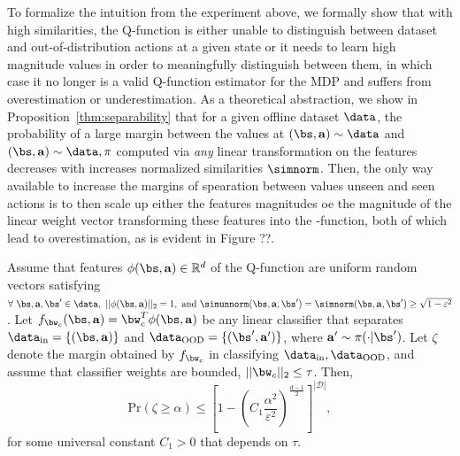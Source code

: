 To formalize the intuition from the experiment above, we formally show that with high similarities, the Q-function is either unable to distinguish between dataset and out-of-distribution actions at a given state or it needs to learn high magnitude values in order to meaningfully distinguish between them, in which case it no longer is a valid Q-function estimator for the MDP and suffers from overestimation or underestimation. 
As a theoretical abstraction, we show in Proposition~\ref{thm:separability} that for a given offline dataset $\data$, %
the probability of a large margin between the values at  $(\bs, \mathbf{a}) \sim \data$ and $(\bs, \mathbf{a}) \sim \data, \pi$
computed via \emph{any} linear transformation on the features decreases with increases normalized similarities $\simnorm$. Then, the only way available to increase the margins of spearation between values unseen and seen actions is to then scale up either the features magnitudes oe the magnitude of the linear weight vector transforming these features into the -function, both of which lead to overestimation, as is evident in Figure ??. 
\begin{proposition}
\label{thm:separability}
Assume that features $\phi(\bs, \mathbf{a}) \in \mathbb{R}^d$ of the Q-function are uniform random vectors satisfying $\forall~ \bs, \mathbf{a}, \bs' \in \data,~ ||\phi(\bs, \mathbf{a})||_2 = 1,\ \mathrm{and}\ \simunnorm(\bs, \mathbf{a}, \bs') = \simnorm(\bs, \mathbf{a}, \bs') \geq \sqrt{1 - \varepsilon^2}$. Let $f_{\bw_c}(\bs, \mathbf{a}) = \bw_c^T \phi(\bs, \mathbf{a})$ be any linear classifier that separates $\data_{\mathrm{in}} = \{(\bs, \mathbf{a})\}$ and $\data_{\mathrm{OOD}} = \{(\bs', \mathbf{a}')\}$, where $\mathbf{a}' \sim \pi(\cdot|\bs')$. Let $\zeta$ denote the margin obtained by $f_{\bw_c}$ in classifying $\data_{\mathrm{in}}, \data_{\mathrm{OOD}}$, and  assume that classifier weights are bounded, $||\bw_c||_2 \leq \tau$.
Then, 
\begin{equation*}
    \text{Pr} \left(\zeta \geq \alpha \right) \leq \left[ 1 - \left( C_1 \frac{\alpha^2}{\varepsilon^2}\right)^{\frac{d-1}{2}} \right]^{|\mathcal{D}|},
\end{equation*}
for some universal constant $C_1 > 0$ that depends on $\tau$.  
\end{proposition}

